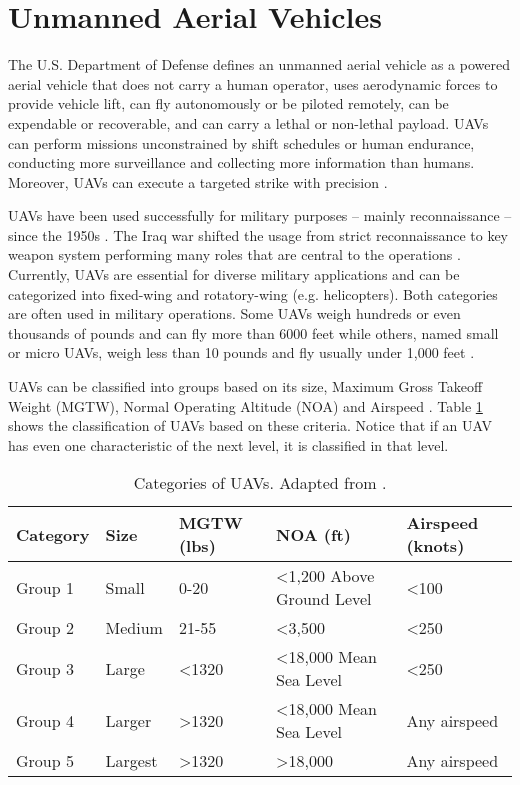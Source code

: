 \section{Unmanned Aerial Vehicles}

The U.S. Department of Defense \cite{staff_2001} defines an unmanned aerial vehicle as a powered aerial vehicle that does not carry a human operator, uses aerodynamic forces to provide vehicle lift, can fly autonomously or be piloted remotely, can be expendable or recoverable, and can carry a lethal or non-lethal payload. UAVs can perform missions unconstrained by shift schedules or human endurance, conducting more surveillance and collecting more information than humans. Moreover, UAVs can execute a targeted strike with precision \cite{foust_2012}. 

UAVs have been used successfully for military purposes -- mainly reconnaissance -- since the 1950s \cite{sullivan_2005}. The Iraq war shifted the usage from strict reconnaissance to key weapon system performing many roles that are central to the operations \cite{fahlstrom_2012}. Currently, UAVs are essential for diverse military applications and can be categorized into fixed-wing and rotatory-wing (e.g. helicopters). Both categories are often used in military operations. Some UAVs weigh hundreds or even thousands of pounds and can fly more than 6000 feet while others, named small or micro UAVs, weigh less than 10 pounds and fly usually under 1,000 feet \cite{chao_2007}.

UAVs can be classified into groups based on its size, Maximum Gross Takeoff Weight (MGTW), Normal Operating Altitude (NOA) and Airspeed \cite{dempsey_2010}. Table \ref{tab:CategoryOfUAVs} shows the classification of UAVs based on these criteria. Notice that if an UAV has even one characteristic of the next level, it is classified in that level.

\begin{table}[hbt]
\centering
\caption{Categories of UAVs. Adapted from \cite{dempsey_2010}.}
\label{tab:CategoryOfUAVs}
\begin{tabular}{lllll}
\hline
Category & Size & MGTW (lbs) & NOA (ft) & Airspeed (knots) \\
\hline
Group 1  & Small   & 0-20                               & \textless1,200 Above Ground Level & \textless100     \\
Group 2  & Medium  & 21-55                              & \textless3,500                    & \textless250     \\
Group 3  & Large   & \textless1320                      & \textless18,000 Mean Sea Level    & \textless250     \\
Group 4  & Larger  & \textgreater1320                   & \textless18,000 Mean Sea Level    & Any airspeed     \\
Group 5  & Largest & \textgreater1320                   & \textgreater18,000                & Any airspeed  \\  
\hline
\end{tabular}
\end{table}

